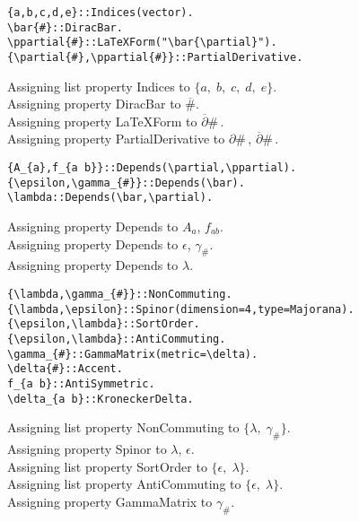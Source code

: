 \documentclass[11pt]{article}
\renewcommand{\bar}[1]{\overline{#1}}
\begin{document}
{\color[named]{Blue}\begin{verbatim}
{a,b,c,d,e}::Indices(vector).
\bar{#}::DiracBar.
\ppartial{#}::LaTeXForm("\bar{\partial}").
{\partial{#},\ppartial{#}}::PartialDerivative.
\end{verbatim}}
Assigning list property Indices to $\{a,\; b,\; c,\; d,\; e\}$.
\\
Assigning property DiracBar to $\bar{\#}$.
\\
Assigning property LaTeXForm to $\bar{\partial}{\#}\, $.
\\
Assigning property PartialDerivative to $\partial{\#}\, $, $\bar{\partial}{\#}\, $.
\\
{\color[named]{Blue}\begin{verbatim}
{A_{a},f_{a b}}::Depends(\partial,\ppartial).
{\epsilon,\gamma_{#}}::Depends(\bar).
\lambda::Depends(\bar,\partial).
\end{verbatim}}
Assigning property Depends to ${A}_{a}$, ${f}_{a b}$.
\\
Assigning property Depends to $\epsilon$, ${\gamma}_{\#}$.
\\
Assigning property Depends to $\lambda$.
\\
{\color[named]{Blue}\begin{verbatim}
{\lambda,\gamma_{#}}::NonCommuting.
{\lambda,\epsilon}::Spinor(dimension=4,type=Majorana).
{\epsilon,\lambda}::SortOrder.
{\epsilon,\lambda}::AntiCommuting.
\gamma_{#}::GammaMatrix(metric=\delta).
\delta{#}::Accent.
f_{a b}::AntiSymmetric.
\delta_{a b}::KroneckerDelta.
\end{verbatim}}
Assigning list property NonCommuting to $\{\lambda,\; {\gamma}_{\#}\}$.
\\
Assigning property Spinor to $\lambda$, $\epsilon$.
\\
Assigning list property SortOrder to $\{\epsilon,\; \lambda\}$.
\\
Assigning list property AntiCommuting to $\{\epsilon,\; \lambda\}$.
\\
Assigning property GammaMatrix to ${\gamma}_{\#}$.
\\
\end{document}

